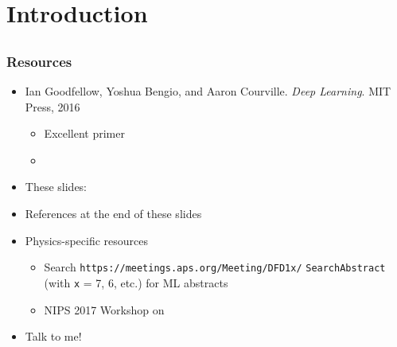 \section{Introduction}

\subsection{}

\begin{frame}
    \frametitle{Resources}

    \begin{itemize}
        \item Ian Goodfellow, Yoshua Bengio, and Aaron Courville.
        \emph{Deep Learning}.
        MIT Press, 2016
        \nocite{GoodfellowDL}
        \begin{itemize}
            \item Excellent primer
            \item {}
        \end{itemize}
        \item These slides: 
        \item References at the end of these slides
        \item Physics-specific resources
        \begin{itemize}
            \item Search \texttt{https://meetings.aps.org/Meeting/DFD1x/} \texttt{SearchAbstract} (with \texttt{x} = 7, 6, etc.) for ML abstracts
            \item NIPS 2017 Workshop on 
        \end{itemize}
        \item Talk to me! \smiley
    \end{itemize}
\end{frame}

